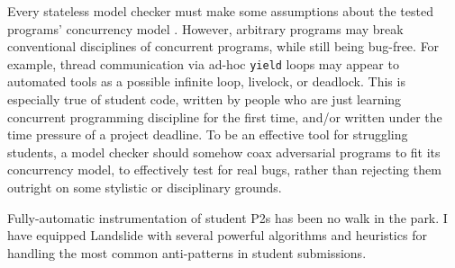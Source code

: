 Every stateless model checker must make some assumptions about the tested programs' concurrency model \cite{chess}.
However, arbitrary programs may break conventional disciplines of concurrent programs, while still being bug-free.
For example, thread communication via ad-hoc {\tt yield} loops may appear to automated tools as a possible
infinite loop, livelock, or deadlock.
This is especially true of student code,
written by people who are just learning concurrent programming discipline for the first time,
and/or written under the time pressure of a project deadline.
To be an effective tool for struggling students,
a model checker should somehow coax adversarial programs to fit its concurrency model, to effectively test for real bugs,
rather than rejecting them outright on some stylistic or disciplinary grounds.

Fully-automatic instrumentation of student P2s has been no walk in the park.
I have equipped Landslide with several powerful algorithms and heuristics for handling the most common anti-patterns in student submissions.

